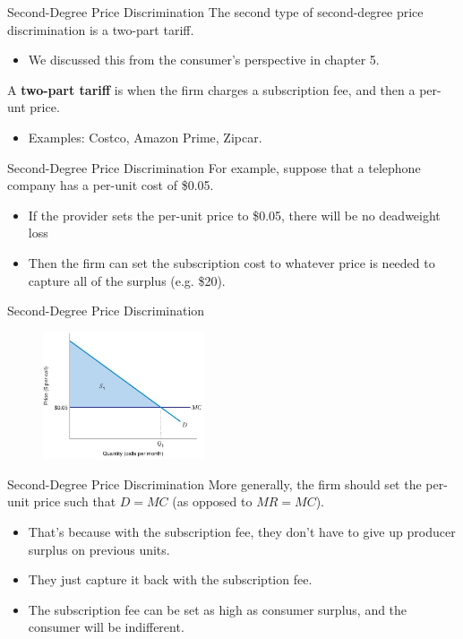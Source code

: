 \documentclass[11pt,t]{beamer}
\begin{document}
\begin{frame}{Second-Degree Price Discrimination}
  The second type of second-degree price discrimination is a two-part tariff.

  \begin{itemize}
    \item We discussed this from the consumer's perspective in chapter 5.
  \end{itemize}

  \bigskip
  A \textbf{two-part tariff} is when the firm charges a subscription fee, and then a per-unt price.

  \begin{itemize}
    \item Examples: Costco, Amazon Prime, Zipcar.
  \end{itemize}
\end{frame}

\begin{frame}{Second-Degree Price Discrimination}
  For example, suppose that a telephone company has a per-unit cost of \$0.05.

  \begin{itemize}
    \item If the provider sets the per-unit price to \$0.05, there will be no deadweight loss
    \item Then the firm can set the subscription cost to whatever price is needed to capture all of the surplus (e.g. \$20).
  \end{itemize}
\end{frame}

\begin{frame}{Second-Degree Price Discrimination}
  \begin{figure}
    \includegraphics[width=180px]{figures/fig12_8.jpg}
  \end{figure}
\end{frame}

\begin{frame}{Second-Degree Price Discrimination}
  More generally, the firm should set the per-unit price such that $D = MC$ (as opposed to $MR = MC$).

  \begin{itemize}
    \item That's because with the subscription fee, they don't have to give up producer surplus on previous units.
    
    \item They just capture it back with the subscription fee.
    
    \item The subscription fee can be set as high as consumer surplus, and the consumer will be indifferent.
  \end{itemize}
\end{frame}
\end{document}

